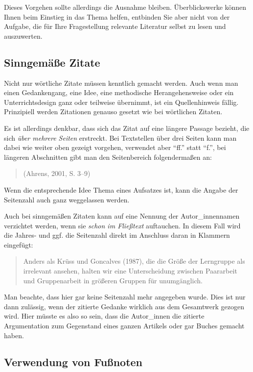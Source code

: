 \documentclass[
  bibliography=totoc,
  oneside,
  12pt,
  a4paper]{scrbook}
\begin{document}
Dieses Vorgehen sollte allerdings die Ausnahme bleiben. Überblickswerke können Ihnen beim Einstieg in das Thema helfen, entbinden Sie aber nicht von der Aufgabe, die für Ihre Fragestellung relevante Literatur selbst zu lesen und auszuwerten.

\hypertarget{sinngemuxe4uxdfe-zitate}{%
\subsection{Sinngemäße Zitate}\label{sinngemuxe4uxdfe-zitate}}

Nicht nur wörtliche Zitate müssen kenntlich gemacht werden. Auch wenn
man einen Gedankengang, eine Idee, eine methodische Herangehensweise
oder ein Unterrichtsdesign ganz oder teilweise übernimmt, ist ein
Quellenhinweis fällig. Prinzipiell werden Zitationen genauso gesetzt wie
bei wörtlichen Zitaten.

Es ist allerdings denkbar, dass sich das Zitat auf eine längere Passage
bezieht, die sich \emph{über mehrere Seiten} erstreckt. Bei Textstellen über
drei Seiten kann man dabei wie weiter oben gezeigt vorgehen, verwendet
aber ``ff.'' statt ``f.'', bei längeren Abschnitten gibt man den
Seitenbereich folgendermaßen an:

\begin{quote}
(Ahrens, 2001, S. 3--9)
\end{quote}

Wenn die entsprechende Idee Thema eines Aufsatzes ist, kann die Angabe
der Seitenzahl auch ganz weggelassen werden.

Auch bei sinngemäßen Zitaten kann auf eine Nennung der Autor\_innennamen
verzichtet werden, wenn sie \emph{schon im Fließtext} auftauchen. In diesem
Fall wird die Jahres- und ggf. die Seitenzahl direkt im Anschluss daran
in Klammern eingefügt:

\begin{quote}
Anders als Krüss und Goncalves (1987), die die Größe der Lerngruppe
als irrelevant ansehen, halten wir eine Unterscheidung zwischen
Paararbeit und Gruppenarbeit in größeren Gruppen für unumgänglich.
\end{quote}

Man beachte, dass hier gar keine Seitenzahl mehr angegeben wurde. Dies
ist nur dann zulässig, wenn der zitierte Gedanke wirklich aus dem
Gesamtwerk gezogen wird. Hier müsste es also so sein, dass die
Autor\_innen die zitierte Argumentation zum Gegenstand eines ganzen
Artikels oder gar Buches gemacht haben.

\hypertarget{verwendung-von-fuuxdfnoten}{%
\subsection*{Verwendung von Fußnoten}\label{verwendung-von-fuuxdfnoten}}
\end{document}
